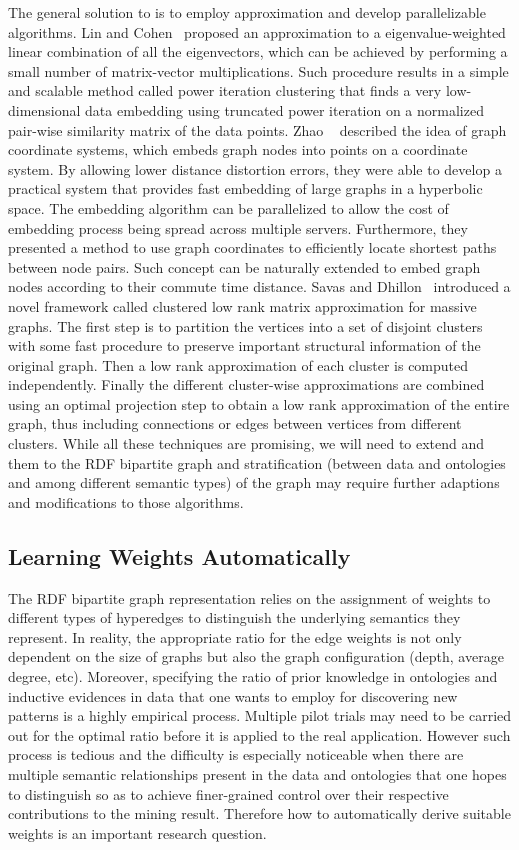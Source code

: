 The general solution to is to employ approximation and develop parallelizable algorithms. Lin and Cohen~\cite{LinEtal2010ICML} proposed an approximation to a eigenvalue-weighted linear combination of all the eigenvectors, which can be achieved by performing a small number of matrix-vector multiplications.  Such procedure results in a simple and scalable method called power iteration clustering that finds a very low-dimensional data embedding using truncated power iteration on a normalized pair-wise similarity matrix of the data points. Zhao \etal~\cite{ZhaoEtal2011Eff} described the idea of graph coordinate systems, which embeds graph nodes into points on a coordinate system. By allowing lower distance distortion errors, they were able to develop a practical system that provides fast embedding of large graphs in a hyperbolic space. The embedding algorithm can be parallelized to allow the cost of embedding process being spread across multiple servers. Furthermore, they presented a method to use graph coordinates to efficiently locate shortest paths between node pairs. Such concept can be naturally extended to embed graph nodes according to their commute time distance. Savas and Dhillon~\cite{SavasEtal2011Clu} introduced a novel framework called clustered low rank matrix approximation for massive graphs. The first step is to partition the vertices into a set of disjoint clusters with some fast procedure to preserve important structural information of the original graph. Then a low rank approximation of each cluster is computed independently. Finally the different cluster-wise approximations are combined using an optimal projection step to obtain a low rank approximation of the entire graph, thus including connections or edges between vertices from different clusters. While all these techniques are promising, we will need to extend and them to the RDF bipartite graph and stratification (between data and ontologies and among different semantic types) of the graph may require further adaptions and modifications to those algorithms.

\subsection{Learning Weights Automatically}
The RDF bipartite graph representation relies on the assignment of weights to different types of hyperedges to distinguish the underlying semantics they represent. In reality, the appropriate ratio for the edge weights is not only dependent on the size of graphs but also the graph configuration (depth, average degree, etc). Moreover, specifying the ratio of prior knowledge in ontologies and inductive evidences in data that one wants to employ for discovering new patterns is a highly empirical process. Multiple pilot trials may need to be carried out for the optimal ratio before it is applied to the real application. However such process is tedious and the difficulty is especially noticeable when there are multiple semantic relationships present in the data and ontologies that one hopes to distinguish so as to achieve finer-grained control over their respective contributions to the mining result. Therefore how to automatically derive suitable weights is an important research question.

